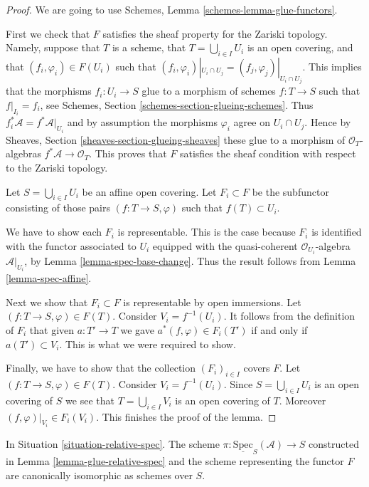 \begin{proof}
We are going to use Schemes, Lemma \ref{schemes-lemma-glue-functors}.

\medskip\noindent
First we check that $F$ satisfies the sheaf property for the
Zariski topology. Namely, suppose that $T$ is a scheme,
that $T = \bigcup_{i \in I} U_i$ is an open covering,
and that $(f_i, \varphi_i) \in F(U_i)$ such that
$(f_i, \varphi_i)|_{U_i \cap U_j} = (f_j, \varphi_j)|_{U_i \cap U_j}$.
This implies that the morphisms $f_i : U_i \to S$
glue to a morphism of schemes $f : T \to S$ such that
$f|_{I_i} = f_i$, see Schemes, Section \ref{schemes-section-glueing-schemes}.
Thus $f_i^*\mathcal{A} = f^*\mathcal{A}|_{U_i}$ and by assumption the
morphisms $\varphi_i$ agree on $U_i \cap U_j$. Hence by Sheaves,
Section \ref{sheaves-section-glueing-sheaves} these glue to a
morphism of $\mathcal{O}_T$-algebras $f^*\mathcal{A} \to \mathcal{O}_T$.
This proves that $F$ satisfies the sheaf condition with respect to
the Zariski topology.

\medskip\noindent
Let $S = \bigcup_{i \in I} U_i$ be an affine open covering.
Let $F_i \subset F$ be the subfunctor consisting of
those pairs $(f : T \to S, \varphi)$ such that
$f(T) \subset U_i$.

\medskip\noindent
We have to show each $F_i$ is representable.
This is the case because $F_i$ is identified with
the functor associated to $U_i$ equipped with
the quasi-coherent $\mathcal{O}_{U_i}$-algebra $\mathcal{A}|_{U_i}$,
by Lemma \ref{lemma-spec-base-change}.
Thus the result follows from Lemma \ref{lemma-spec-affine}.

\medskip\noindent
Next we show that $F_i \subset F$ is representable by open immersions.
Let $(f : T \to S, \varphi) \in F(T)$. Consider $V_i = f^{-1}(U_i)$.
It follows from the definition of $F_i$ that given $a : T' \to T$
we gave $a^*(f, \varphi) \in F_i(T')$ if and only if $a(T') \subset V_i$.
This is what we were required to show.

\medskip\noindent
Finally, we have to show that the collection $(F_i)_{i \in I}$
covers $F$. Let $(f : T \to S, \varphi) \in F(T)$.
Consider $V_i = f^{-1}(U_i)$. Since $S = \bigcup_{i \in I} U_i$
is an open covering of $S$ we see that $T = \bigcup_{i \in I} V_i$
is an open covering of $T$. Moreover $(f, \varphi)|_{V_i} \in F_i(V_i)$.
This finishes the proof of the lemma.
\end{proof}

\begin{lemma}
\label{lemma-glueing-gives-functor-spec}
In Situation \ref{situation-relative-spec}.
The scheme $\pi : \underline{\text{Spec}}_S(\mathcal{A}) \to S$
constructed in Lemma \ref{lemma-glue-relative-spec}
and the scheme representing the functor $F$ are
canonically isomorphic as schemes over $S$.
\end{lemma}

